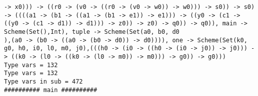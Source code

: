 \documentclass[11pt,oneside,a4paper]{report}
\begin{document}
\begin{lstlisting}[breaklines=true,caption={The output of an exponential type},label=lst:appedix:bigexp]
-> x0))) -> ((r0 -> (v0 -> ((r0 -> (v0 -> w0)) -> w0))) -> s0)) -> s0) -> ((((a1 -> (b1 -> ((a1 -> (b1 -> e1)) -> e1))) -> ((y0 -> (c1 -> ((y0 -> (c1 -> d1)) -> d1))) -> z0)) -> z0) -> q0)) -> q0)), main -> Scheme(Set(),Int), tuple -> Scheme(Set(a0, b0, d0
),(a0 -> (b0 -> ((a0 -> (b0 -> d0)) -> d0)))), one -> Scheme(Set(k0, g0, h0, i0, l0, m0, j0),(((h0 -> (i0 -> ((h0 -> (i0 -> j0)) -> j0))) -> ((k0 -> (l0 -> ((k0 -> (l0 -> m0)) -> m0))) -> g0)) -> g0)))
Type vars = 132
Type vars = 132
Type vars in sub = 472
########## main ##########
\end{lstlisting}
\end{document}
